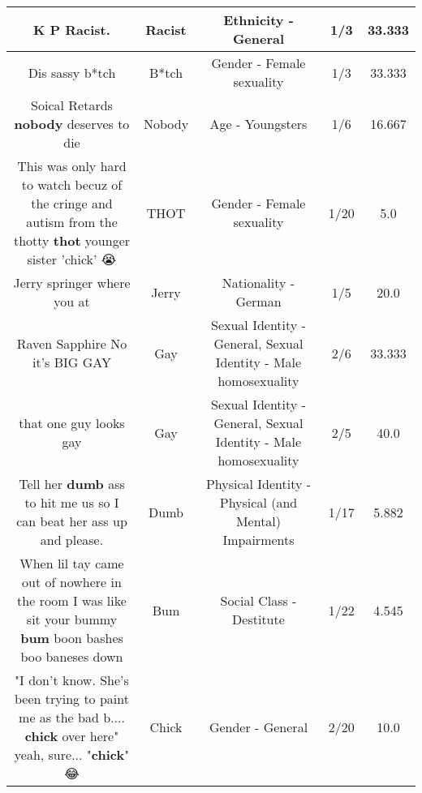 \documentclass[11pt]{article}
\newlength\mylength
\begin{document}
\begin{center}
\begin{longtable}{|C{.65\mylength}|C{.30\mylength}|C{.12\mylength}|C{.12\mylength}|C{.12\mylength}|}
  \small K P \textbf{Racist}.\normalsize   & Racist & Ethnicity - General & 1/3 & 33.333 \\  \hline
  \small Dis sassy b*tch\normalsize   & B*tch & Gender - Female sexuality & 1/3 & 33.333 \\  \hline
  \small Soical Retards \textbf{nobody} deserves to die\normalsize   & Nobody & Age - Youngsters & 1/6 & 16.667 \\  \hline
  \small This was only hard to watch becuz of the cringe and autism from the thotty \textbf{thot} younger sister 'chick' 😭\normalsize   & THOT & Gender - Female sexuality & 1/20 & 5.0 \\  \hline
  \small Jerry springer where you at\normalsize   & Jerry & Nationality - German & 1/5 & 20.0 \\  \hline
  \small Raven Sapphire No it's BIG GAY\normalsize   & Gay & Sexual Identity - General, Sexual Identity - Male homosexuality & 2/6 & 33.333 \\  \hline
  \small that one guy looks gay\normalsize   & Gay & Sexual Identity - General, Sexual Identity - Male homosexuality & 2/5 & 40.0 \\  \hline
  \small Tell her \textbf{dumb} ass to hit me us so I can beat her ass up and please.\normalsize   & Dumb & Physical Identity - Physical (and Mental) Impairments & 1/17 & 5.882 \\  \hline
  \small When lil tay came out of nowhere in the room I was like sit your bummy \textbf{bum} boon bashes boo baneses down\normalsize   & Bum & Social Class - Destitute & 1/22 & 4.545 \\  \hline
  \small "I don't know. She's been trying to paint me as the bad b.... \textbf{chick} over here" yeah, sure... "\textbf{chick}" 😂\normalsize   & Chick & Gender - General & 2/20 & 10.0 \\  \hline

\end{longtable}
\end{center}
\end{document}
